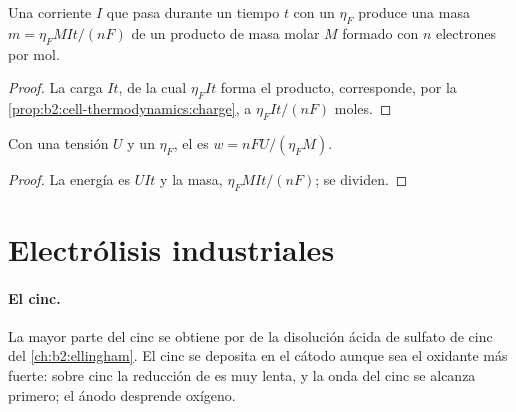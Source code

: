 \begin{proposition}\label{prop:b2:batteries-electrolysis:faraday-mass}
Una corriente $I$ que pasa durante un tiempo $t$ con un  $\eta_F$ produce una
masa $m = \eta_F MIt/(nF)$ de un producto de masa molar $M$ formado con $n$
electrones por mol.
\end{proposition}

\begin{proof}
La carga $It$, de la cual $\eta_F It$ forma el producto, corresponde, por la
\cref{prop:b2:cell-thermodynamics:charge}, a $\eta_F It/(nF)$ moles.
\end{proof}

\begin{proposition}\label{prop:b2:batteries-electrolysis:energy}
Con una tensión $U$ y un  $\eta_F$, el  es $w = nFU/(\eta_F M)$.
\end{proposition}

\begin{proof}
La energía es $UIt$ y la masa, $\eta_F MIt/(nF)$; se dividen.
\end{proof}

\section{Electrólisis industriales}

\paragraph{El cinc.} La mayor parte del cinc se obtiene por  de la disolución
ácida de sulfato de cinc del \cref{ch:b2:ellingham}. El cinc se deposita en el cátodo aunque
 sea el oxidante más fuerte: sobre cinc la reducción de  es muy lenta,
y la onda del cinc se alcanza primero; el ánodo desprende oxígeno.

